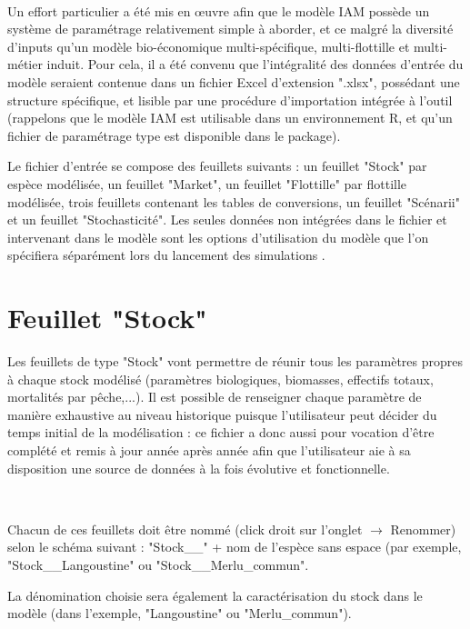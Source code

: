 \documentclass[12pt, colorinlistoftodos]{article}
\newenvironment{not used}[1]{%
    \longtable{%
        |>{\centering$\displaystyle}A{#1}{1}<{$}%
        |}\hline\ignorespaces}{%
    \endlongtable\ignorespacesafterend}
\newcommand\Warning{%
 \makebox[1.4em][c]{%
 \makebox[0pt][c]{\raisebox{.1em}{\small!}}%
 \makebox[0pt][c]{\color{red}\Large$\bigtriangleup$}}}%
\begin{document}
\par~\par

Un effort particulier a été mis en œuvre afin que le modèle IAM possède un système de paramétrage  relativement simple à aborder, et ce malgré la diversité d'inputs qu'un modèle bio-économique multi-spécifique, multi-flottille et multi-métier induit. Pour cela, il a été convenu que l'intégralité des données d'entrée du modèle seraient contenue dans un fichier Excel d'extension ".xlsx", possédant une structure spécifique, et lisible par une procédure d'importation intégrée à l'outil (rappelons que le modèle IAM est utilisable dans un environnement R, et qu'un fichier de paramétrage type est disponible dans le package).
	
Le fichier d'entrée se compose des feuillets suivants : un feuillet "Stock" par espèce modélisée, un feuillet "Market", un feuillet "Flottille" par flottille modélisée, trois feuillets contenant les tables de conversions, un feuillet "Scénarii" et un feuillet "Stochasticité". Les seules données non intégrées dans le fichier et intervenant dans le modèle sont les options d'utilisation du modèle que l'on spécifiera séparément lors du lancement des simulations .  	

\section{Feuillet "Stock"} \label{sec:stock}

Les feuillets de type "Stock" vont permettre de réunir tous les paramètres propres à chaque stock modélisé (paramètres biologiques, biomasses, effectifs totaux, mortalités par pêche,...). Il est possible de renseigner chaque paramètre de manière exhaustive au niveau historique puisque l'utilisateur peut décider du temps initial de la modélisation : ce fichier a donc aussi pour vocation d'être complété et remis à jour année après année afin que l'utilisateur aie à sa disposition une source de données à la fois évolutive et fonctionnelle.

\par~\par

Chacun de ces feuillets doit être nommé (click droit sur l'onglet $ \to $ Renommer) selon le schéma suivant : "Stock\_\_" +  nom de l'espèce sans espace (par exemple, "Stock\_\_Langoustine" ou "Stock\_\_Merlu\_commun".

\Warning La dénomination choisie sera également la caractérisation du stock dans le modèle (dans l'exemple, "Langoustine" ou "Merlu\_commun").
\end{document}
